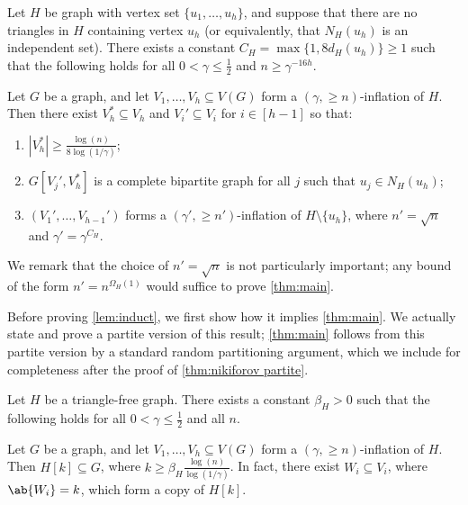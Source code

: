 \begin{lemma}\label{lem:induct}
    Let $H$ be graph with vertex set $\{u_1,\dots,u_h\}$, and suppose that there are no triangles in $H$ containing vertex $u_h$ (or equivalently, that $N_H(u_h)$ is an independent set). There exists a constant $C_H=\max \{1,8d_H(u_h)\}\geq 1$ such that the following holds for all $0<\gamma \leq \frac 12$ and $n \geq \gamma^{-16h}$.
    
    Let $G$ be a graph, and let $V_1,\dots,V_h \subseteq V(G)$ form a $(\gamma,\geq n)$-inflation of $H$.
    Then there exist $V_h^*\subseteq V_h$ and $V_i'\subseteq V_i$ for $i\in [h-1]$ so that:
    \begin{enumerate}
        \item $|V_h^*|\ge \frac{\log(n)}{8\log(1/\gamma)}$;
        \item $G[V_j',V_h^*]$ is a complete bipartite graph for all $j$ such that $u_j\in N_H(u_h)$;
        \item $(V_1',\dots,V_{h-1}')$ forms a $(\gamma',\geq n')$-inflation of $H \setminus \{u_h\}$, where $n' =\sqrt n$ and $\gamma' = \gamma^{C_H}$.
    \end{enumerate}
\end{lemma}
We remark that the choice of $n' = \sqrt n$ is not particularly important; any bound of the form $n' = n^{\Omega_H(1)}$ would suffice to prove \cref{thm:main}.

Before proving \cref{lem:induct}, we first show how it implies \cref{thm:main}. We actually state and prove a partite version of this result; \cref{thm:main} follows from this partite version by a standard random partitioning argument, which we include for completeness after the proof of \cref{thm:nikiforov partite}.
\begin{theorem}\label{thm:nikiforov partite}
    Let $H$ be a triangle-free graph. There exists a constant $\beta_H>0$ such that the following holds for all $0<\gamma\leq \frac 12$ and all $n$. 

    Let $G$ be a graph, and let $V_1,\dots,V_h \subseteq V(G)$ form a $(\gamma,\geq n)$-inflation of $H$. Then $H[k] \subseteq G$, where $k \geq \beta_H \frac{\log(n)}{\log(1/\gamma)}$. In fact, there exist $W_i \subseteq V_i$, where $\ab{W_i}=k$, which form a copy of $H[k]$.
\end{theorem}

